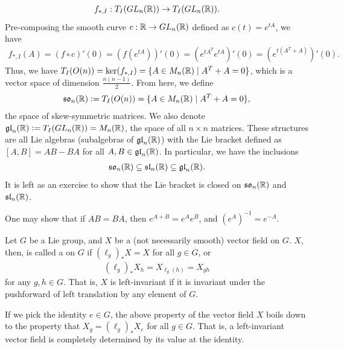 \begin{align}
    f_{\ast,I}:T_{I}(GL_{n}(\mathbb{R})) \to T_{I}(GL_{n}(\mathbb{R})).
\end{align}
Pre-composing the smooth curve $c:\mathbb{R} \to GL_{n}(\mathbb{R})$ defined as $c(t) = e^{tA}$, we have
\begin{align}
    f_{\ast,I}(A) = (f \circ c)'(0) = (f(e^{tA}))'(0) = (e^{tA^T}e^{tA})'(0) = (e^{t(A^T+A)})'(0).
\end{align}
Thus, we have $T_{I}(O(n)) = \ker(f_{\ast,I}) = \{A \in M_{n}(\mathbb{R}) \mid A^{T}+A = 0\}$, which is a vector space of dimension $\frac{n(n-1)}{2}$. From here, we define
\begin{align}
    \mathfrak{so}_{n}(\mathbb{R}) \vcentcolon= T_{I}(O(n)) = \{A \in M_{n}(\mathbb{R}) \mid A^{T}+A = 0\},
\end{align}
the space of skew-symmetric matrices. We also denote $\mathfrak{gl}_{n}(\mathbb{R}) \vcentcolon= T_{I}(GL_{n}(\mathbb{R})) = M_{n}(\mathbb{R})$, the space of all $n \times n$ matrices. These structures are all Lie algebras (subalgebras of $\mathfrak{gl}_{n}(\mathbb{R})$) with the Lie bracket defined as $[A,B] = AB - BA$ for all $A,B \in \mathfrak{gl}_{n}(\mathbb{R})$. In particular, we have the inclusions
\begin{align}
    \mathfrak{so}_{n}(\mathbb{R}) \subseteq \mathfrak{sl}_{n}(\mathbb{R}) \subseteq \mathfrak{gl}_{n}(\mathbb{R}).    
\end{align}
It is left as an exercise to show that the Lie bracket is closed on $\mathfrak{so}_{n}(\mathbb{R})$ and $\mathfrak{sl}_{n}(\mathbb{R})$.

One may show that if $AB = BA$, then $e^{A+B} = e^{A}e^{B}$, and $(e^{A})^{-1} = e^{-A}$. 

\begin{definition}
    Let $G$ be a Lie group, and $X$ be a (not necessarily smooth) vector field on $G$. $X$, then, is called a  on $G$ if $(\ell_{g})_{\ast}X = X$ for all $g \in G$, or
    \begin{align}
        (\ell_{g})_{\ast}X_{h} = X_{\ell_{g}(h)} = X_{gh}
    \end{align}
    for any $g,h \in G$. That is, $X$ is left-invariant if it is invariant under the pushforward of left translation by any element of $G$.
\end{definition}
If we pick the identity $e \in G$, the above property of the vector field $X$ boils down to the property that $X_{g} = (\ell_{g})_{\ast}X_{e}$ for all $g \in G$. That is, a left-invariant vector field is completely determined by its value at the identity.

